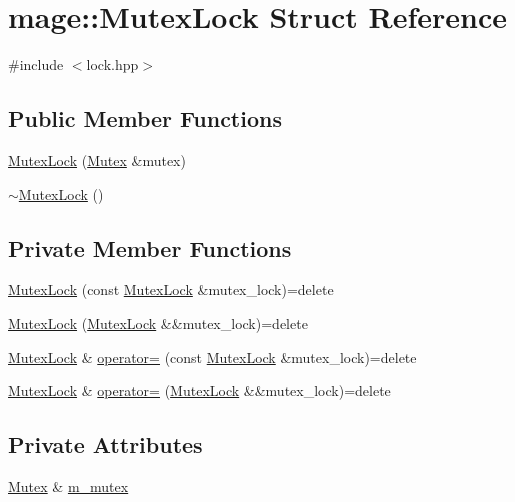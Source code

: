 \hypertarget{structmage_1_1_mutex_lock}{}\section{mage\+:\+:Mutex\+Lock Struct Reference}
\label{structmage_1_1_mutex_lock}


{\ttfamily \#include $<$lock.\+hpp$>$}

\subsection*{Public Member Functions}
\begin{DoxyCompactItemize}
\item 
\hyperlink{structmage_1_1_mutex_lock_aa8cd93677eec2656ca217fdf79f911c4}{Mutex\+Lock} (\hyperlink{classmage_1_1_mutex}{Mutex} \&mutex)
\item 
\hyperlink{structmage_1_1_mutex_lock_a2631e8878646b2d25b136b6adb55d553}{$\sim$\+Mutex\+Lock} ()
\end{DoxyCompactItemize}
\subsection*{Private Member Functions}
\begin{DoxyCompactItemize}
\item 
\hyperlink{structmage_1_1_mutex_lock_a20b0f44c31bcb2040cbf23f071870af9}{Mutex\+Lock} (const \hyperlink{structmage_1_1_mutex_lock}{Mutex\+Lock} \&mutex\+\_\+lock)=delete
\item 
\hyperlink{structmage_1_1_mutex_lock_a5045ffd6d3743b7994ba2ddfaf093a4a}{Mutex\+Lock} (\hyperlink{structmage_1_1_mutex_lock}{Mutex\+Lock} \&\&mutex\+\_\+lock)=delete
\item 
\hyperlink{structmage_1_1_mutex_lock}{Mutex\+Lock} \& \hyperlink{structmage_1_1_mutex_lock_a739909161a9a9ca0fc8143ac84967765}{operator=} (const \hyperlink{structmage_1_1_mutex_lock}{Mutex\+Lock} \&mutex\+\_\+lock)=delete
\item 
\hyperlink{structmage_1_1_mutex_lock}{Mutex\+Lock} \& \hyperlink{structmage_1_1_mutex_lock_a189a5b4efe2831352b13bd30b80ea47d}{operator=} (\hyperlink{structmage_1_1_mutex_lock}{Mutex\+Lock} \&\&mutex\+\_\+lock)=delete
\end{DoxyCompactItemize}
\subsection*{Private Attributes}
\begin{DoxyCompactItemize}
\item 
\hyperlink{classmage_1_1_mutex}{Mutex} \& \hyperlink{structmage_1_1_mutex_lock_a1c796e1e66bd49007fe746d1425b82f4}{m\+\_\+mutex}
\end{DoxyCompactItemize}


